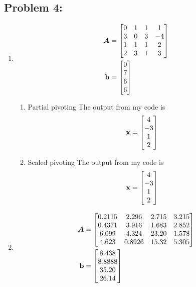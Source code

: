 \documentclass{article}
\begin{document}
 



\hypertarget{problem_0_homework_checklist_2}{}
\subsection*{{Problem 4: }}
\label{}

\begin{enumerate}[label=(\alph*)]
\item 
\begin{align*} 
\boldsymbol{A} &= \begin{bmatrix} 0 & 1 & 1 & 1\\ 3 & 0 & 3 & -4\\ 1 & 1 & 1 & 2\\ 2 & 3 & 1 & 3 \end{bmatrix}\\
\boldsymbol{\mathrm{b}} &= \begin{bmatrix} 0 \\ 7 \\ 6 \\ 6  \end{bmatrix} 
\end{align*} 

\begin{enumerate}[label=(\roman*)] 
\item Partial pivoting 
The output from my code is \begin{align*} \boldsymbol{\mathrm{x}} = \begin{bmatrix} 4 \\ -3 \\ 1 \\ 2  \end{bmatrix} \end{align*} 
\item Scaled pivoting 
The output from my code is \begin{align*} \boldsymbol{\mathrm{x}} = \begin{bmatrix} 4 \\ -3 \\ 1 \\ 2  \end{bmatrix} \end{align*} 
\end{enumerate} 


\item 
\begin{align*} 
\boldsymbol{A} &= \begin{bmatrix} 	0.2115 & 2.296 & 2.715 & 3.215 \\ 
			0.4371 & 3.916 & 1.683 & 2.852 \\ 
			6.099 & 4.324 & 23.20 & 1.578 \\
			4.623 & 0.8926 & 15.32 & 5.305 
			 \end{bmatrix}\\
\boldsymbol{\mathrm{b}} &= \begin{bmatrix} 8.438 \\ 8.8888 \\ 35.20 \\ 26.14 \end{bmatrix} 
\end{align*} 




\end{enumerate}
\end{document}
